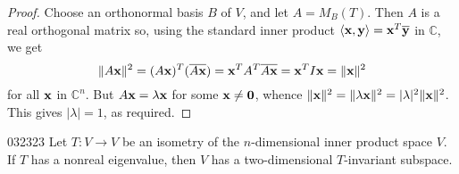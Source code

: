 \begin{proof}
Choose an orthonormal basis $B$ of $V$, and let $A = M_{B}(T)$. Then $A$ is a real orthogonal matrix so, using the standard inner product $ \langle \textbf{x}, \textbf{y} \rangle = \textbf{x}^T \overline{\textbf{y}} $ in $\mathbb{C}$, we get
\begin{equation*}
\| A\textbf{x} \| ^2 = (A\textbf{x})^T(\overline{A\textbf{x}}) = \textbf{x}^T A^T \overline{A\textbf{x}} = \textbf{x}^TI\textbf{x} = \| \textbf{x} \| ^2
\end{equation*}
for all $\textbf{x}$ in $\mathbb{C}^n$. But $A\textbf{x} = \lambda\textbf{x}$ for some $\textbf{x} \neq \textbf{0}$, whence $\|\textbf{x}\|^{2} = \|\lambda\textbf{x}\|^{2} = |\lambda|^{2}\|\textbf{x}\|^{2}$. This gives $|\lambda| = 1$, as required.
\end{proof}

\begin{lemma}{}{032323}
Let $T : V \to V$ be an isometry of the $n$-dimensional inner product space $V$. If $T$ has a nonreal eigenvalue, then $V$ has a two-dimensional $T$-invariant subspace.
\end{lemma}

